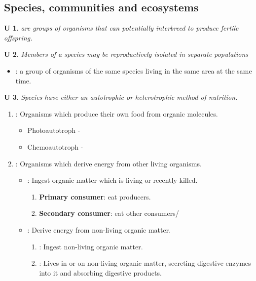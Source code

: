 \documentclass[12pt, a4paper]{article}
\newtheorem{und}{U}[subsection]
\begin{document}
\subsection{Species, communities and ecosystems}
\begin{und}
    \textbf{\color{red}{Species}} are groups of organisms that can potentially interbreed to produce fertile offspring. 
\end{und}
\quad\quad{\color{blue}{e.g. Mules are not considered as a species. }}
\begin{und}
    Members of a species may be reproductively isolated in separate populations
\end{und}
\begin{itemize}
    \item \textbf{\color{red}{Population}}: a group of organisms of the same species living in the same area at the same time. 
\end{itemize}
\begin{und}
    Species have either an autotrophic or heterotrophic method of nutrition. 
\end{und}
\begin{enumerate}
    \item \textbf{\color{red}{Autotroph}}: Organisms which produce their own food from organic molecules. \\ {\color{blue}{e.g.self-feeding, producers}}
    \begin{itemize}
        \item Photoautotroph - {\color{blue}{photosynthesis}}
        \item Chemoautotroph - {\color{blue}{chemosynthesis}}
    \end{itemize}
    \item \textbf{\color{red}{Heterotroph}}: Organisms which derive energy from other living organisms. 
    \begin{itemize}
        \item \textbf{\color{red}{Consumer}}: Ingest organic matter which is living or recently killed. 
        \begin{enumerate}
            \item \textbf{Primary consumer}: eat producers. 
            \item \textbf{Secondary consumer}: eat other consumers/
        \end{enumerate}
        \item \textbf{\color{red}{Decomposer}}: Derive energy from non-living organic matter. 
        \begin{enumerate}
            \item \textbf{\color{red}{Detritivore}}: Ingest non-living organic matter. 
            \item \textbf{\color{red}{Saprotroph}}: Lives in or on non-living organic matter, secreting digestive enzymes into it and absorbing digestive products. 
        \end{enumerate}
    \end{itemize}
\end{enumerate}
\end{document}
